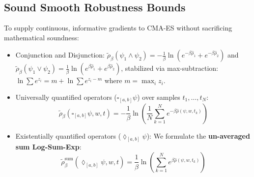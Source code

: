 \documentclass[journal]{IEEEtran}
\begin{document}
\subsection{Sound Smooth Robustness Bounds}
To supply continuous, informative gradients to CMA-ES without sacrificing mathematical soundness:
\begin{itemize}
    \item Conjunction and Disjunction: $\tilde{\rho}_\beta(\psi_1 \land \psi_2) = -\frac{1}{\beta} \ln(e^{-\beta \hat{\rho}_1} + e^{-\beta \hat{\rho}_2})$ and $\tilde{\rho}_\beta(\psi_1 \lor \psi_2) = \frac{1}{\beta} \ln(e^{\beta \hat{\rho}_1} + e^{\beta \hat{\rho}_2})$, stabilized via max-subtraction: $\ln \sum e^{z_i} = m + \ln \sum e^{z_i - m}$ where $m = \max_i z_i$.
    \item Universally quantified operators ($\square_{[a,b]} \psi$) over samples $t_1, \dots, t_N$:
    \begin{equation}
    \tilde{\rho}_\beta(\square_{[a,b]} \psi, w, t) = -\frac{1}{\beta} \ln \!\left( \frac{1}{N} \sum_{k=1}^N e^{-\beta \hat{\rho}(\psi, w, t_k)} \right)
    \end{equation}
    \item Existentially quantified operators ($\lozenge_{[a,b]} \psi$): We formulate the \textbf{un-averaged sum Log-Sum-Exp}:
    \begin{equation}
    \tilde{\rho}_\beta^{\text{sum}}(\lozenge_{[a,b]} \psi, w, t) = \frac{1}{\beta} \ln \!\left( \sum_{k=1}^N e^{\beta \hat{\rho}(\psi, w, t_k)} \right)
    \end{equation}
\end{itemize}
\end{document}
